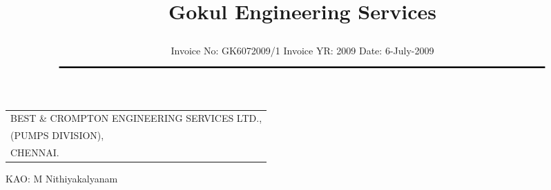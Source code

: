 \documentclass[11pt]{article}
\title{\vspace*{1cm} \centerline{ \Huge { \bf \hspace{0cm} Gokul Engineering Services}\vspace*{-0.5cm}}}
\author{%
 \scriptsize Invoice No: GK6072009/1  \hspace*{4cm}  Invoice YR: 2009 \hspace*{4cm} Date:  6-July-2009\\
$\rule{7.0in}{0.5mm}$}
\date{}
\begin{document}
\maketitle
\thispagestyle{empty}
\vspace*{0cm}	
\begin{flushleft}
{\footnotesize{
\begin{tabular}{l}
BEST \& CROMPTON ENGINEERING SERVICES LTD.,\\
(PUMPS DIVISION),\\
CHENNAI.\\
\end{tabular}
}}
\end{flushleft}

\vspace*{-1cm}

\hfill{\footnotesize KAO: M Nithiyakalyanam}\vspace*{1cm}


\end{document}
